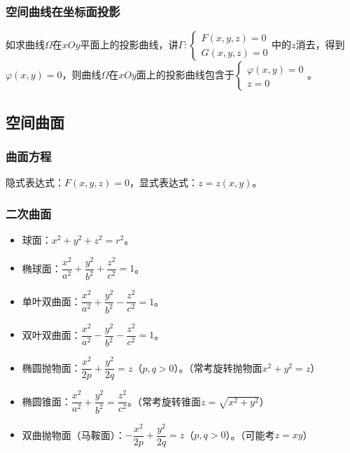 \documentclass[UTF8, 12pt]{ctexart}
\begin{document}
        \subsubsection{空间曲线在坐标面投影}

        如求曲线$\varOmega$在$xOy$平面上的投影曲线，讲$\varGamma:\left\{\begin{array}{l}
                                                                           F(x,y,z)=0 \\
                                                                           G(x,y,z)=0
        \end{array}\right.$中的$z$消去，得到$\varphi(x,y)=0$，则曲线$\varOmega$在$xOy$面上的投影曲线包含于$\left\{\begin{array}{l}
                                                                                                                    \varphi(x,y)=0 \\
                                                                                                                    z=0
        \end{array}\right.$。

        \subsection{空间曲面}

        \subsubsection{曲面方程}

        隐式表达式：$F(x,y,z)=0$，显式表达式：$z=z(x,y)$。

        \subsubsection{二次曲面}

        \begin{itemize}
            \item 球面：$x^2+y^2+z^2=r^2$。
            \item 椭球面：$\dfrac{x^2}{a^2}+\dfrac{y^2}{b^2}+\dfrac{z^2}{c^2}=1$。
            \item 单叶双曲面：$\dfrac{x^2}{a^2}+\dfrac{y^2}{b^2}-\dfrac{z^2}{c^2}=1$。
            \item 双叶双曲面：$\dfrac{x^2}{a^2}-\dfrac{y^2}{b^2}-\dfrac{z^2}{c^2}=1$。
            \item 椭圆抛物面：$\dfrac{x^2}{2p}+\dfrac{y^2}{2q}=z$（$p,q>0$）。（常考旋转抛物面$x^2+y^2=z$）
            \item 椭圆锥面：$\dfrac{x^2}{a^2}+\dfrac{y^2}{b^2}=\dfrac{z^2}{c^2}$。（常考旋转锥面$z=\sqrt{x^2+y^2}$）
            \item 双曲抛物面（马鞍面）：$-\dfrac{x^2}{2p}+\dfrac{y^2}{2q}=z$（$p,q>0$）。（可能考$z=xy$）
        \end{itemize}
\end{document}
